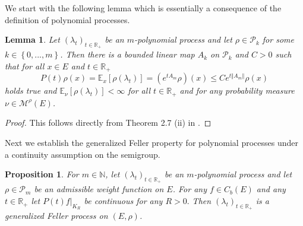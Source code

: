 \documentclass[a4paper,12pt]{article}
\newtheorem{lemma}[theorem]{Lemma}
\newtheorem{proposition}[theorem]{Proposition}
\theoremstyle{definition}
\theoremstyle{remark}
\numberwithin{equation}{section}
\numberwithin{theorem}{section}
\begin{document}
We start with the following lemma which is essentially a consequence of the definition of polynomial processes.

\begin{lemma}
\label{lem: m-polynomial process on polynomial remains bounded }
Let $\left(\lambda_{t}\right)_{t\in\mathbb{R}_{+}}$ be an $m$-polynomial
process and let $\rho\in\mathcal{P}_{k}$ for some $k\in\left\{ 0,...,m\right\} $.
Then there is a bounded linear map $A_{k}$ on $\mathcal{P}_{k}$ and $C>0$
such that for all $x\in E$ and $t\in\mathbb{R}_{+}$ 
\[
P(t)\rho(x)=\mathbb{E}_{x}\left[\rho(\lambda_{t})\right]=\left(e^{tA_{m}}\rho\right)(x)\leq C e^{t\left\Vert A_{m}\right\Vert } \rho(x)
\]
holds true and $\mathbb{E}_{\nu}\left[\rho(\lambda_{t})\right]<\infty$
for all $t\in\mathbb{R}_{+}$ and for any probability measure  $\nu\in\mathcal{M}^{\rho}(E)$. 
\end{lemma}

\begin{proof}
This follows directly from Theorem 2.7 (ii) in \cite{CMT}.
\end{proof}


Next we establish the generalized Feller property for polynomial processes under a continuity assumption on the semigroup.


\begin{proposition}
\label{prop:polynomial process is generalized Feller} For $m\in\mathbb{N}$, 
let $\left(\lambda_{t}\right)_{t\in\mathbb{R}_{+}}$ be an $m$-polynomial
process and let $\rho\in\mathcal{P}_{m}$ be an admissible weight
function on $E$. For any $f\in C_{b}(E)$ and any $t\in\mathbb{R}_{+}$
let $\left.P(t)f\right|_{K_{R}}$ be continuous for any $R>0.$ Then
$\left(\lambda_{t}\right)_{t\in\mathbb{R}_{+}}$ is a generalized
Feller process on $\left(E,\rho\right)$.
\end{proposition}
\end{document}
